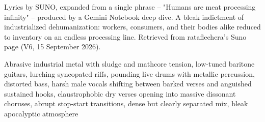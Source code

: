 
\label{sec:mouth-of-the-machine}
\begin{notes}
Lyrics by SUNO, expanded from a single phrase -- "Humans are meat processing infinity" -- produced by a Gemini Notebook deep dive. A bleak indictment of industrialized dehumanization: workers, consumers, and their bodies alike reduced to inventory on an endless processing line. Retrieved from rataflechera's Suno page (V6, 15 September 2026).
\end{notes}
\begin{style}
Abrasive industrial metal with sludge and mathcore tension, low-tuned baritone guitars, lurching syncopated riffs, pounding live drums with metallic percussion, distorted bass, harsh male vocals shifting between barked verses and anguished sustained hooks, claustrophobic dry verses opening into massive dissonant choruses, abrupt stop-start transitions, dense but clearly separated mix, bleak apocalyptic atmosphere
\end{style}
